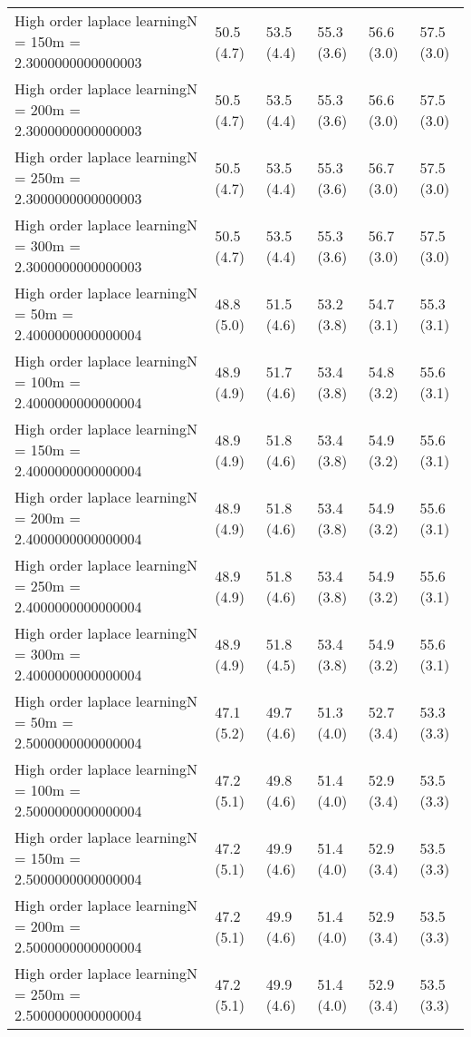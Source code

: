 \documentclass{article}
\begin{document}
\begin{table*}[t!]
\begin{center}
\begin{small}
\begin{sc}
\begin{tabular}{llllll}
High order laplace learningN = 150m = 2.3000000000000003&50.5 (4.7)      &53.5 (4.4)      &55.3 (3.6)      &56.6 (3.0)      &57.5 (3.0)      \\
High order laplace learningN = 200m = 2.3000000000000003&50.5 (4.7)      &53.5 (4.4)      &55.3 (3.6)      &56.6 (3.0)      &57.5 (3.0)      \\
High order laplace learningN = 250m = 2.3000000000000003&50.5 (4.7)      &53.5 (4.4)      &55.3 (3.6)      &56.7 (3.0)      &57.5 (3.0)      \\
High order laplace learningN = 300m = 2.3000000000000003&50.5 (4.7)      &53.5 (4.4)      &55.3 (3.6)      &56.7 (3.0)      &57.5 (3.0)      \\
High order laplace learningN = 50m = 2.4000000000000004&48.8 (5.0)      &51.5 (4.6)      &53.2 (3.8)      &54.7 (3.1)      &55.3 (3.1)      \\
High order laplace learningN = 100m = 2.4000000000000004&48.9 (4.9)      &51.7 (4.6)      &53.4 (3.8)      &54.8 (3.2)      &55.6 (3.1)      \\
High order laplace learningN = 150m = 2.4000000000000004&48.9 (4.9)      &51.8 (4.6)      &53.4 (3.8)      &54.9 (3.2)      &55.6 (3.1)      \\
High order laplace learningN = 200m = 2.4000000000000004&48.9 (4.9)      &51.8 (4.6)      &53.4 (3.8)      &54.9 (3.2)      &55.6 (3.1)      \\
High order laplace learningN = 250m = 2.4000000000000004&48.9 (4.9)      &51.8 (4.6)      &53.4 (3.8)      &54.9 (3.2)      &55.6 (3.1)      \\
High order laplace learningN = 300m = 2.4000000000000004&48.9 (4.9)      &51.8 (4.5)      &53.4 (3.8)      &54.9 (3.2)      &55.6 (3.1)      \\
High order laplace learningN = 50m = 2.5000000000000004&47.1 (5.2)      &49.7 (4.6)      &51.3 (4.0)      &52.7 (3.4)      &53.3 (3.3)      \\
High order laplace learningN = 100m = 2.5000000000000004&47.2 (5.1)      &49.8 (4.6)      &51.4 (4.0)      &52.9 (3.4)      &53.5 (3.3)      \\
High order laplace learningN = 150m = 2.5000000000000004&47.2 (5.1)      &49.9 (4.6)      &51.4 (4.0)      &52.9 (3.4)      &53.5 (3.3)      \\
High order laplace learningN = 200m = 2.5000000000000004&47.2 (5.1)      &49.9 (4.6)      &51.4 (4.0)      &52.9 (3.4)      &53.5 (3.3)      \\
High order laplace learningN = 250m = 2.5000000000000004&47.2 (5.1)      &49.9 (4.6)      &51.4 (4.0)      &52.9 (3.4)      &53.5 (3.3)      \\

\end{tabular}
\end{sc}
\end{small}
\end{center}
\end{table*}
\end{document}

